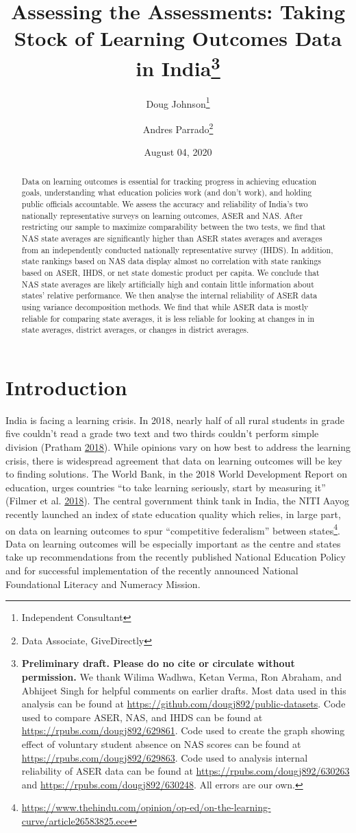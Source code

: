 \documentclass[
  11pt,
]{article}
\title{Assessing the Assessments: Taking Stock of Learning Outcomes Data in India\thanks{\textbf{Preliminary draft. Please do no cite or circulate without permission.} We thank Wilima Wadhwa, Ketan Verma, Ron Abraham, and Abhijeet Singh for helpful comments on earlier drafts. Most data used in this analysis can be found at \url{https://github.com/dougj892/public-datasets}. Code used to compare ASER, NAS, and IHDS can be found at \url{https://rpubs.com/dougj892/629861}. Code used to create the graph showing effect of voluntary student absence on NAS scores can be found at \url{https://rpubs.com/dougj892/629863}. Code used to analysis internal reliability of ASER data can be found at \url{https://rpubs.com/dougj892/630263} and \url{https://rpubs.com/dougj892/630248}. All errors are our own.}}
\author{Doug Johnson\footnote{Independent Consultant} \and Andres Parrado\footnote{Data Associate, GiveDirectly}}
\date{August 04, 2020}
\begin{document}
\maketitle
\begin{abstract}
Data on learning outcomes is essential for tracking progress in achieving education goals, understanding what education policies work (and don't work), and holding public officials accountable. We assess the accuracy and reliability of India's two nationally representative surveys on learning outcomes, ASER and NAS. After restricting our sample to maximize comparability between the two tests, we find that NAS state averages are significantly higher than ASER states averages and averages from an independently conducted nationally representative survey (IHDS). In addition, state rankings based on NAS data display almost no correlation with state rankings based on ASER, IHDS, or net state domestic product per capita. We conclude that NAS state averages are likely artificially high and contain little information about states' relative performance. We then analyse the internal reliability of ASER data using variance decomposition methods. We find that while ASER data is mostly reliable for comparing state averages, it is less reliable for looking at changes in in state averages, district averages, or changes in district averages.
\end{abstract}

\newpage

\hypertarget{introduction}{%
\section{Introduction}\label{introduction}}

India is facing a learning crisis. In 2018, nearly half of all rural students in grade five couldn't read a grade two text and two thirds couldn't perform simple division (Pratham \protect\hyperlink{ref-aser2018}{2018}). While opinions vary on how best to address the learning crisis, there is widespread agreement that data on learning outcomes will be key to finding solutions. The World Bank, in the 2018 World Development Report on education, urges countries ``to take learning seriously, start by measuring it'' (Filmer et al. \protect\hyperlink{ref-filmer2018learning}{2018}). The central government think tank in India, the NITI Aayog recently launched an index of state education quality which relies, in large part, on data on learning outcomes to spur ``competitive federalism'' between states\footnote{\url{https://www.thehindu.com/opinion/op-ed/on-the-learning-curve/article26583825.ece}}. Data on learning outcomes will be especially important as the centre and states take up recommendations from the recently published National Education Policy and for successful implementation of the recently announced National Foundational Literacy and Numeracy Mission.
\end{document}

